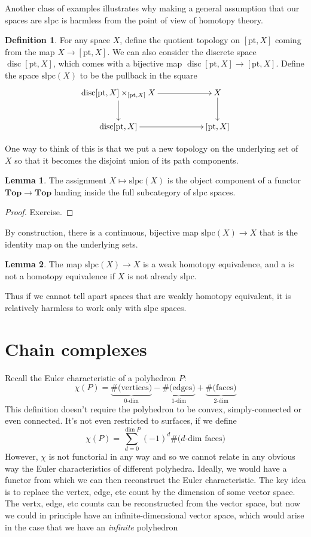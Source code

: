 \documentclass{tufte-handout}
\def\pt {\mathrm{pt}}
\def\Top {\mathbf{Top}}
\DeclareMathOperator{\disc}{disc}
\theoremstyle{definition}
\newtheorem{lemma}{Lemma}
\newtheorem{definition}{Definition}
\begin{document}
Another class of examples illustrates why making a general assumption that our spaces are slpc is harmless from the point of view of homotopy theory.

\begin{definition}
For any space $X$, define the quotient topology on $[\pt,X]$ coming from the map $X\to [\pt,X]$. We can also consider the discrete space $\disc[\pt,X]$, which comes with a bijective map $\disc[\pt,X] \to [\pt,X]$. Define the space $\mathrm{slpc}(X)$ to be the pullback in the square
\[
	\xymatrix{
		\disc[\pt,X] \times_{[\pt,X]} X \ar[rr] \ar[d] && X \ar[d]\\
		\disc[\pt,X] \ar[rr] && [\pt,X]
	}
\]
\end{definition}

One way to think of this is that we put a new topology on the underlying set of $X$ so that it becomes the disjoint union of its path components.

\begin{lemma}
The assignment $X\mapsto \mathrm{slpc}(X)$ is the object component of a functor $\Top \to \Top$ landing inside the full subcategory of slpc spaces.
\end{lemma}

\begin{proof}
Exercise.
\end{proof}

By construction, there is a continuous, bijective map $\mathrm{slpc}(X) \to X$ that is the identity map on the underlying sets.

\begin{lemma}
The map $\mathrm{slpc}(X) \to X$ is a weak homotopy equivalence, and a is not a homotopy equivalence if $X$ is not already slpc.
\end{lemma}

Thus if we cannot tell apart spaces that are weakly homotopy equivalent, it is relatively harmless to work only with slpc spaces.

\section{Chain complexes}

Recall the Euler characteristic of a polyhedron $P$:
\[
	\chi(P) = \underbrace{\text{\#(vertices)}}_{0\text{-dim}} - \underbrace{\text{\#(edges)}}_{1\text{-dim}} + \underbrace{\text{\#(faces)}}_{2\text{-dim}}
\]
This definition doesn't require the polyhedron to be convex, simply-connected or even connected. It's not even restricted to surfaces, if we define
\[
	\chi(P) = \sum_{d=0}^{\dim P} (-1)^d \text{\#($d$-dim faces)}
\]
However, $\chi$ is not functorial in any way and so we cannot relate in any obvious way the Euler characteristics of different polyhedra. Ideally, we would have a functor from which we can then reconstruct the Euler characteristic. The key idea is to replace the vertex, edge, etc count by the dimension of some vector space. The vertx, edge, etc counts can be reconstructed from the vector space, but now we could in principle have an infinite-dimensional vector space, which would arise in the case that we have an \emph{infinite} polyhedron
\end{document}
